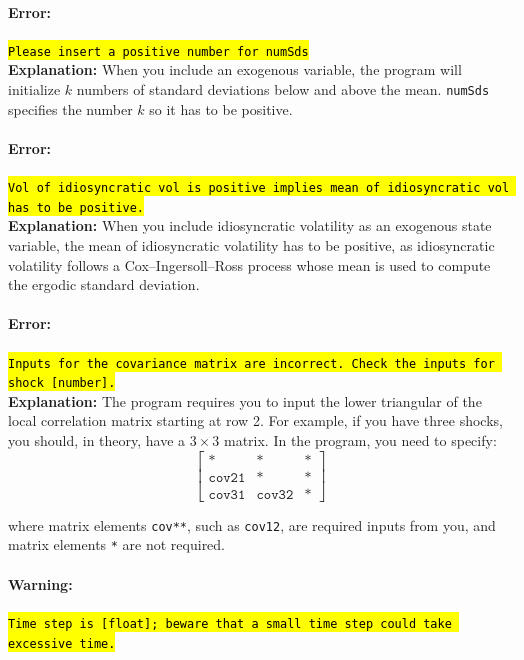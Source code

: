 \documentclass[12pt]{article}
\begin{document}
\paragraph{Error:} \hl{\texttt{Please insert a positive number for numSds}}\\

\textbf{Explanation:} When you include an exogenous variable, the program will initialize $k$ numbers of standard deviations below and above the mean. \texttt{numSds} specifies the number $k$ so it has to be positive.


\paragraph{Error:} \hl{\texttt{Vol of idiosyncratic vol is positive implies mean of idiosyncratic vol has to be positive.}}\\

\textbf{Explanation:} When you include idiosyncratic volatility as an exogenous state variable, the mean of idiosyncratic volatility has to be positive, as idiosyncratic volatility follows a Cox–Ingersoll–Ross process whose mean is used to compute the ergodic standard deviation.

\paragraph{Error:} \hl{\texttt{Inputs for the covariance matrix are incorrect. Check the inputs for shock [number].}}\\

\textbf{Explanation:} The program requires you to input the lower triangular of the local correlation matrix starting at row 2. For example, if you have three shocks, you should, in theory, have a $3 \times 3$ matrix. In the program, you need to specify:
\[
\begin{bmatrix}
    \texttt{*} &  \texttt{*} & \texttt{*}  \\
    \texttt{cov21} & \texttt{*} & \texttt{*} \\
     \texttt{cov31}  &  \texttt{cov32}  & \texttt{*} 
\end{bmatrix}
\]

where matrix elements \texttt{cov**}, such as \texttt{cov12}, are required inputs from you, and matrix elements \texttt{*} are not required. 

\paragraph{Warning:} \hl{\texttt{Time step is [float]; beware that a small time step could take excessive time.}}\\
\end{document}
